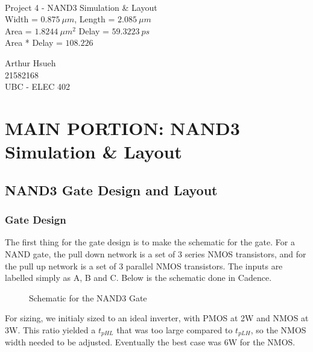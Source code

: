 \documentclass[12pt]{article}
\newcommand{\doctitle}{Project 4 - NAND3 Simulation \& Layout}
\newcommand{\docsubtitle}{Simulation and Layout Problems}
\newcommand{\docsubsub}{Width = $\SI{0.875}{\mu m}$, Length = $\SI{2.085}{\mu m}$\\ Area = $\SI{1.8244}{\mu m^2}$ Delay = $\SI{59.3223}{ps}$\\ Area * Delay = $\SI{108.226}{}$ }
\renewcommand{\maketitle} {
    \setlength{\parindent}{0pt}
    \begin{center} \
        \vspace*{1in}

        \huge{\doctitle}\\
        \large{\docsubsub}

        \vspace*{0.2in}
        \large{
            Arthur Hsueh\\
            21582168\\
            UBC - ELEC 402
        }
    \end{center}
}
\begin{document}
\maketitle
\thispagestyle{empty}
\pagebreak

\tableofcontents
\thispagestyle{empty}
\pagebreak

\listoffigures
\thispagestyle{empty}

\listoftables
\thispagestyle{empty}

\pagebreak
\setcounter{page}{1}
\section{MAIN PORTION: NAND3 Simulation \& Layout}
\subsection{NAND3 Gate Design and Layout} %
\subsubsection{Gate Design}
The first thing for the gate design is to make the schematic for the gate. For a NAND gate, the pull down network is a set of 3 series NMOS transistors, and for the pull up network is a set of 3 parallel NMOS transistors. The inputs are labelled simply as A, B and C. Below is the schematic done in Cadence.
\begin{figure} [H]
    \centering
    \caption{Schematic for the NAND3 Gate}
\end{figure}
For sizing, we initialy sized to an ideal inverter, with PMOS at 2W and NMOS at 3W. This ratio yielded a $t_{pHL}$ that was too large compared to $t_{pLH}$, so the NMOS width needed to be adjusted. Eventually the best case was 6W for the NMOS.
\end{document}
